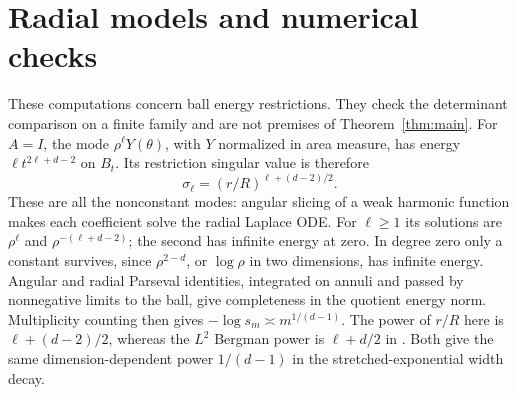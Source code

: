 \documentclass[11pt]{article}
\theoremstyle{remark}
\begin{document}
\section{Radial models and numerical checks}\label{sec:numerics}
These computations concern ball energy restrictions. They check the
determinant comparison on a finite family and are not premises of
Theorem~\ref{thm:main}. For $A=I$, the mode $\rho^\ell Y(\theta)$,
with $Y$ normalized in area measure, has energy $\ell t^{2\ell+d-2}$
on $B_t$. Its restriction singular value is therefore
\begin{equation}\label{eq:exactball}
 \sigma_\ell=(r/R)^{\ell+(d-2)/2}.
\end{equation}
These are all the nonconstant modes: angular slicing of a weak harmonic
function makes each coefficient solve the radial Laplace ODE. For
$\ell\ge1$ its solutions are $\rho^\ell$ and
$\rho^{-(\ell+d-2)}$; the second has infinite energy at zero.
In degree zero only a constant survives, since $\rho^{2-d}$, or
$\log\rho$ in two dimensions, has infinite energy. Angular and radial
Parseval identities, integrated on annuli and passed by nonnegative limits
to the ball, give completeness in the quotient energy norm.
Multiplicity counting then gives $-\log s_m\asymp m^{1/(d-1)}$.
The power of $r/R$ here is $\ell+(d-2)/2$, whereas the $L^2$ Bergman
power is $\ell+d/2$ in \cite[Proposition 3.3]{BandtlowChu2009}.
Both give the same dimension-dependent power $1/(d-1)$ in the
stretched-exponential width decay.
\end{document}
